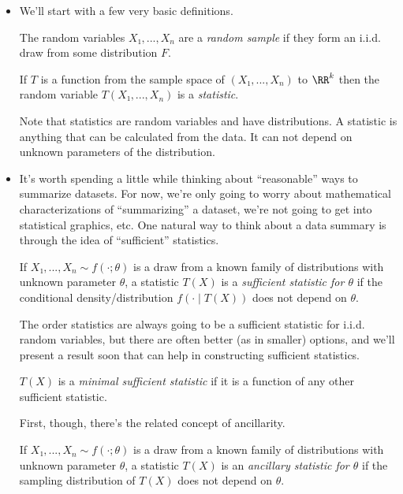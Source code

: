 \begin{itemize}

\item We'll start with a few very basic definitions.
  \begin{defn}
    The random variables $X₁,...,X_n$ are a \emph{random sample} if
    they form an i.i.d. draw from some distribution $F$.
  \end{defn}

  \begin{defn}
    If $T$ is a function from the sample space of $(X₁,...,X_n)$ to
    $\RR^k$ then the random variable $T(X₁,...,X_n)$ is a
    \emph{statistic}.
  \end{defn}

  Note that statistics are random variables and have distributions.  A
  statistic is anything that can be calculated from the data.  It can
  not depend on unknown parameters of the distribution.

\item It's worth spending a little while thinking about ``reasonable''
  ways to summarize datasets.  For now, we're only going to worry
  about mathematical characterizations of ``summarizing'' a dataset,
  we're not going to get into statistical graphics, etc.  One natural
  way to think about a data summary is through the idea of
  ``sufficient'' statistics.

  \begin{defn}
    If $X₁,...,X_n ∼ f(·; θ)$ is a draw from a known family of
    distributions with unknown parameter $θ$, a statistic $T(X)$ is a
    \emph{sufficient statistic for $θ$} if the conditional
    density/distribution $f(· ∣ T(X))$ does not depend on $θ$.
  \end{defn}

  The order statistics are always going to be a sufficient statistic
  for i.i.d. random variables, but there are often better (as in
  smaller) options, and we'll present a result soon that can help in
  constructing sufficient statistics.

  \begin{defn}
    $T(X)$ is a \emph{minimal sufficient statistic} if it is a
    function of any other sufficient statistic.
  \end{defn}

  First, though, there's the related concept of ancillarity.

  \begin{defn}
    If $X₁,...,X_n ∼ f(·; θ)$ is a draw from a known family of
    distributions with unknown parameter $θ$, a statistic $T(X)$ is an
    \emph{ancillary statistic for $θ$} if the sampling distribution of
    $T(X)$ does not depend on $θ$.
  \end{defn}


\end{itemize}
